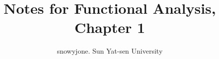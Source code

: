 \documentclass[11pt, a4paper]{article}
\begin{document}
\title{Notes for Functional Analysis, Chapter 1}
\author{snowyjone. Sun Yat-sen University}
\maketitle
\end{document}
